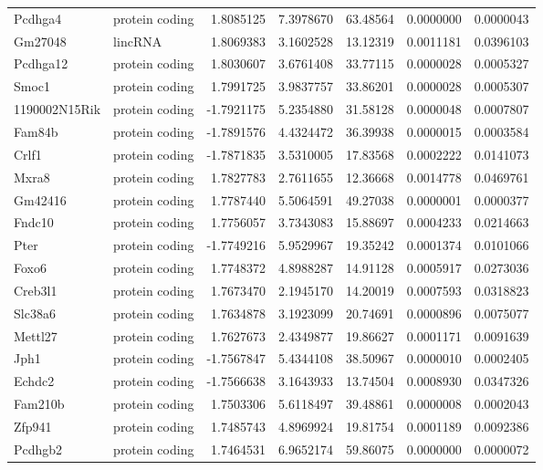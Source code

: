 \documentclass[onehalf,12pt]{beavtex}
\begin{document}
\begin{longtable}{llrrrrr}
  Pcdhga4 & protein coding & 1.8085125 & 7.3978670 & 63.48564 & 0.0000000 & 0.0000043\\
  Gm27048 & lincRNA & 1.8069383 & 3.1602528 & 13.12319 & 0.0011181 & 0.0396103\\
  Pcdhga12 & protein coding & 1.8030607 & 3.6761408 & 33.77115 & 0.0000028 & 0.0005327\\
  \addlinespace
  Smoc1 & protein coding & 1.7991725 & 3.9837757 & 33.86201 & 0.0000028 & 0.0005307\\
  1190002N15Rik & protein coding & -1.7921175 & 5.2354880 & 31.58128 & 0.0000048 & 0.0007807\\
  Fam84b & protein coding & -1.7891576 & 4.4324472 & 36.39938 & 0.0000015 & 0.0003584\\
  Crlf1 & protein coding & -1.7871835 & 3.5310005 & 17.83568 & 0.0002222 & 0.0141073\\
  Mxra8 & protein coding & 1.7827783 & 2.7611655 & 12.36668 & 0.0014778 & 0.0469761\\
  \addlinespace
  Gm42416 & protein coding & 1.7787440 & 5.5064591 & 49.27038 & 0.0000001 & 0.0000377\\
  Fndc10 & protein coding & 1.7756057 & 3.7343083 & 15.88697 & 0.0004233 & 0.0214663\\
  Pter & protein coding & -1.7749216 & 5.9529967 & 19.35242 & 0.0001374 & 0.0101066\\
  Foxo6 & protein coding & 1.7748372 & 4.8988287 & 14.91128 & 0.0005917 & 0.0273036\\
  Creb3l1 & protein coding & 1.7673470 & 2.1945170 & 14.20019 & 0.0007593 & 0.0318823\\
  \addlinespace
  Slc38a6 & protein coding & 1.7634878 & 3.1923099 & 20.74691 & 0.0000896 & 0.0075077\\
  Mettl27 & protein coding & 1.7627673 & 2.4349877 & 19.86627 & 0.0001171 & 0.0091639\\
  Jph1 & protein coding & -1.7567847 & 5.4344108 & 38.50967 & 0.0000010 & 0.0002405\\
  Echdc2 & protein coding & -1.7566638 & 3.1643933 & 13.74504 & 0.0008930 & 0.0347326\\
  Fam210b & protein coding & 1.7503306 & 5.6118497 & 39.48861 & 0.0000008 & 0.0002043\\
  \addlinespace
  Zfp941 & protein coding & 1.7485743 & 4.8969924 & 19.81754 & 0.0001189 & 0.0092386\\
  Pcdhgb2 & protein coding & 1.7464531 & 6.9652174 & 59.86075 & 0.0000000 & 0.0000072\\

\end{longtable}
\end{document}
